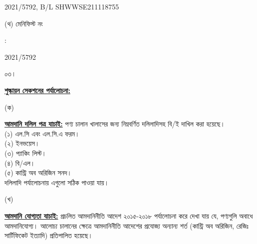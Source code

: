 \documentclass[12pt]{article}
\newcommand{\blno}{SHWWSE211118755}
\newcommand{\menifest}{2021/5792}
\begin{document}
\begin{minipage}[t]{0.53\linewidth}
{\menifest}, B/L {\blno}
\\
\end{minipage}
\begin{minipage}[t]{0.05\linewidth}
\hspace*{1em}
\end{minipage}
\begin{minipage}[t]{0.40\linewidth}
(থ) মেনিফিস্ট নং
\end{minipage}
\begin{minipage}[t]{0.02\linewidth}
:
\end{minipage}
\begin{minipage}[t]{0.53\linewidth}
{\menifest}
\\
\end{minipage}
\normalsize
\begin{minipage}[t]{0.05\linewidth}
০৩।
\end{minipage}
\begin{minipage}[t]{0.95\linewidth}
\underline{\textbf{শুল্কায়ন সেকশনের পর্যালোচনা:}}
\end{minipage}
\begin{minipage}[t]{0.05\linewidth}
\hspace{1em}
\end{minipage}
\begin{minipage}[t]{0.05\linewidth}
(ক)
\end{minipage}
\begin{minipage}[t]{0.90\linewidth}
\underline{\textbf{আমদানি দলিল পত্র যাচাই:}}
পণ্য চালান খালাসের জন্য নিম্নবর্ণিত দলিলাদিসহ বি/ই দাখিল করা
হয়েছে।
\\
(১) এল.সি এবং এল.সি.এ ফরম।
\\
(২) ইনভয়েস।
\\
(৩) প্যাকিং লিস্ট।
\\
(৪) বি/এল।
\\
(৫) কান্ট্রি অব অরিজিন সনদ।
\\
দলিলাদি পর্যালোচনায় এগুলো
সঠিক পাওয়া যায়।
\\
\end{minipage}
\begin{minipage}[t]{0.05\linewidth}
\hspace{1em}
\end{minipage}
\begin{minipage}[t]{0.05\linewidth}
(খ)
\end{minipage}
\begin{minipage}[t]{0.90\linewidth}
\underline{\textbf{আমদানি যোগ্যতা যাচাই:}}
প্রচলিত আমদানিনীতি আদেশ ২০১৫-২০১৮  পর্যালোচনা করে দেখা যায় যে, পণ্যগুলি অবাধে আমদানিযোগ্য।
আলোচ্য চালানের ক্ষেত্রে আমদানিনীতি আদেশের প্রযোজ্য অন্যান্য শর্ত (কান্ট্রি অব অরিজিন, রেজিঃ
সার্টিফিকেট ইত্যাদি) প্রতিপালিত হয়েছে।
\\
\end{minipage}
\end{document}
